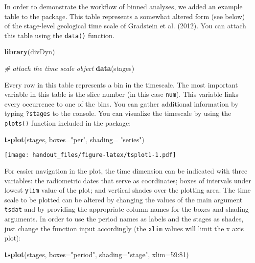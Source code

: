 \documentclass[]{article}
\newenvironment{Shaded}{\begin{snugshade}}{\end{snugshade}}
\newcommand{\KeywordTok}[1]{\textcolor[rgb]{0.13,0.29,0.53}{\textbf{{#1}}}}
\newcommand{\DataTypeTok}[1]{\textcolor[rgb]{0.13,0.29,0.53}{{#1}}}
\newcommand{\DecValTok}[1]{\textcolor[rgb]{0.00,0.00,0.81}{{#1}}}
\newcommand{\StringTok}[1]{\textcolor[rgb]{0.31,0.60,0.02}{{#1}}}
\newcommand{\CommentTok}[1]{\textcolor[rgb]{0.56,0.35,0.01}{\textit{{#1}}}}
\newcommand{\NormalTok}[1]{{#1}}
\begin{document}
In order to demonstrate the workflow of binned analyses, we added an
example table to the package. This table represents a somewhat altered
form (see below) of the stage-level geological time scale of Gradstein
et al. (2012). You can attach this table using the \texttt{data()}
function.

\begin{Shaded}
\begin{Highlighting}[]
\KeywordTok{library}\NormalTok{(divDyn)}
\end{Highlighting}
\end{Shaded}

\begin{Shaded}
\begin{Highlighting}[]
\CommentTok{# attach the time scale object}
\KeywordTok{data}\NormalTok{(stages)}
\end{Highlighting}
\end{Shaded}

Every row in this table represents a bin in the timescale. The most
important variable in this table is the slice number (in this case
\texttt{num}). This variable links every occurrence to one of the bins.
You can gather additional information by typing \texttt{?stages} to the
console. You can visualize the timescale by using the \texttt{plots()}
function included in the package:

\begin{Shaded}
\begin{Highlighting}[]
\KeywordTok{tsplot}\NormalTok{(stages, }\DataTypeTok{boxes=}\StringTok{"per"}\NormalTok{, }\DataTypeTok{shading=} \StringTok{"series"}\NormalTok{)}
\end{Highlighting}
\end{Shaded}

\texttt{[image: handout\_files/figure-latex/tsplot1-1.pdf]}

For easier navigation in the plot, the time dimension can be indicated
with three variables: the radiometric dates that serve as coordinates;
boxes of intervals under lowest \texttt{ylim} value of the plot; and
vertical shades over the plotting area. The time scale to be plotted can
be altered by changing the values of the main argument \texttt{tsdat}
and by providing the appropriate column names for the boxes and shading
arguments. In order to use the period names as labels and the stages as
shades, just change the function input accordingly (the \texttt{xlim}
values will limit the x axis plot):

\begin{Shaded}
\begin{Highlighting}[]
\KeywordTok{tsplot}\NormalTok{(stages, }\DataTypeTok{boxes=}\StringTok{"period"}\NormalTok{, }\DataTypeTok{shading=}\StringTok{"stage"}\NormalTok{, }\DataTypeTok{xlim=}\DecValTok{59}\NormalTok{:}\DecValTok{81}\NormalTok{)}
\end{Highlighting}
\end{Shaded}
\end{document}
